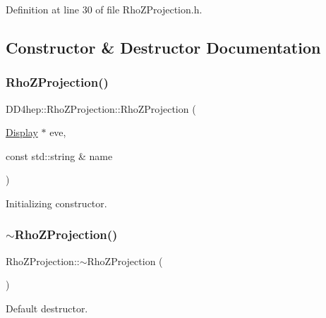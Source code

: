 Definition at line 30 of file Rho\+Z\+Projection.\+h.



\subsection{Constructor \& Destructor Documentation}
\hypertarget{class_d_d4hep_1_1_rho_z_projection_a53e97713415f13369aa528096a8e5a6b}{}\label{class_d_d4hep_1_1_rho_z_projection_a53e97713415f13369aa528096a8e5a6b} 
\subsubsection{\texorpdfstring{Rho\+Z\+Projection()}{RhoZProjection()}}
{\footnotesize\ttfamily D\+D4hep\+::\+Rho\+Z\+Projection\+::\+Rho\+Z\+Projection (\begin{DoxyParamCaption}\item[{\hyperlink{class_d_d4hep_1_1_display}{Display} $\ast$}]{eve,  }\item[{const std\+::string \&}]{name }\end{DoxyParamCaption})}



Initializing constructor. 

\hypertarget{class_d_d4hep_1_1_rho_z_projection_a196da05dd078d07f9f05e2a6b3eb9f3a}{}\label{class_d_d4hep_1_1_rho_z_projection_a196da05dd078d07f9f05e2a6b3eb9f3a} 
\subsubsection{\texorpdfstring{$\sim$\+Rho\+Z\+Projection()}{~RhoZProjection()}}
{\footnotesize\ttfamily Rho\+Z\+Projection\+::$\sim$\+Rho\+Z\+Projection (\begin{DoxyParamCaption}{ }\end{DoxyParamCaption})\hspace{0.3cm}{\ttfamily [virtual]}}



Default destructor. 



